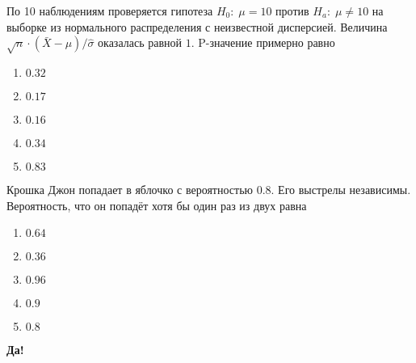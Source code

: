 \documentclass[t]{beamer}
\begin{document}
 \begin{frame} \label{63} 
\begin{block}{63} 

По 10 наблюдениям проверяется гипотеза $H_0: \; \mu=10$ против $H_a: \; \mu \neq 10$ на выборке из нормального распределения с неизвестной дисперсией. Величина $\sqrt{n}\cdot (\bar{X}-\mu)/\hat{\sigma}$ оказалась равной $1$. P-значение примерно равно
 


 \end{block} 
\begin{enumerate} 
\item[] \hyperlink{63-No}{\beamergotobutton{} $0.32$}
\item[] \hyperlink{63-No}{\beamergotobutton{} $0.17$}
\item[] \hyperlink{63-Yes}{\beamergotobutton{} $0.16$}
\item[] \hyperlink{63-No}{\beamergotobutton{} $0.34$}
\item[] \hyperlink{63-No}{\beamergotobutton{} $0.83$}
\end{enumerate} 
\end{frame} 


 \begin{frame} \label{1-Yes} 
\begin{block}{1} 

Крошка Джон  попадает в яблочко с вероятностью $0.8$. Его выстрелы независимы. Вероятность, что он попадёт хотя бы один раз из двух равна
 


 \end{block} 
\begin{enumerate} 
\item[] \hyperlink{1-No}{\beamergotobutton{} $0.64$}
\item[] \hyperlink{1-No}{\beamergotobutton{} $0.36$}
\item[] \hyperlink{1-Yes}{\beamergotobutton{} $0.96$}
\item[] \hyperlink{1-No}{\beamergotobutton{} $0.9$
}
\item[] \hyperlink{1-No}{\beamergotobutton{} $0.8$}
\end{enumerate} 

 \textbf{Да!} 
 \hyperlink{2}{}\end{frame} 
\end{document}
